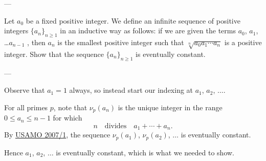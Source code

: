 
---

Let $a_0$ be a fixed positive integer. We define an infinite sequence of positive integers $\{a_n\}_{n\ge1}$ in an inductive way as follows: if we are given the terms $a_0$, $a_1$, \ldots $a_{n-1}$ , then $a_n$ is the smallest positive integer such that $\sqrt[n]{a_0a_1\cdots a_n}$ is a positive integer. Show that the sequence $\{a_n\}_{n\ge1}$ is eventually constant.

---

Observe that $a_1=1$ always, so instead start our indexing at $a_1$, $a_2$, $\ldots$.

For all primes $p$, note that $\nu_p(a_n)$ is the unique integer in the range $0\le a_n\le n-1$ for which
\[n\quad\text{divides}\quad a_1+\cdots+a_n.\]
By \href{https://aops.com/community/c6h145842p825490}{USAMO 2007/1}, the sequence $\nu_p(a_1)$, $\nu_p(a_2)$, $\ldots$ is eventually constant.

Hence $a_1$, $a_2$, $\ldots$ is eventually constant, which is what we needed to show.

